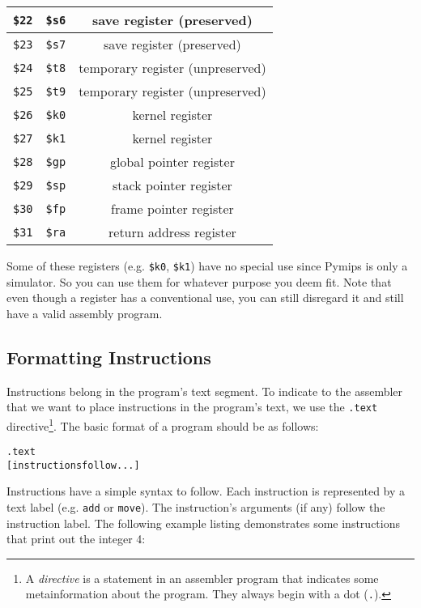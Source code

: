 \documentclass[12pt]{article}
\begin{document}
\begin{tabular}{c | c | c}
    \texttt{\$22} & \texttt{\$s6} & save register (preserved) \\ \hline
    \texttt{\$23} & \texttt{\$s7} & save register (preserved) \\ \hline
    \texttt{\$24} & \texttt{\$t8} & temporary register (unpreserved) \\ \hline
    \texttt{\$25} & \texttt{\$t9} & temporary register (unpreserved) \\ \hline
    \texttt{\$26} & \texttt{\$k0} & kernel register \\ \hline
    \texttt{\$27} & \texttt{\$k1} & kernel register \\ \hline
    \texttt{\$28} & \texttt{\$gp} & global pointer register \\ \hline
    \texttt{\$29} & \texttt{\$sp} & stack pointer register \\ \hline
    \texttt{\$30} & \texttt{\$fp} & frame pointer register \\ \hline
    \texttt{\$31} & \texttt{\$ra} & return address register \\ \hline
\end{tabular}

\vspace{0.1in} Some of these registers (e.g. \texttt{\$k0}, \texttt{\$k1}) have
     no special use since Pymips is only a simulator. So you can use them for
     whatever purpose you deem fit. Note that even though a register has a
     conventional use, you can still disregard it and still have a valid
     assembly program.\\

\subsection{Formatting Instructions}

Instructions belong in the program's text segment. To indicate to the assembler
     that we want to place instructions in the program's text, we use the
     \texttt{.text} directive\footnote{A \textit{directive} is a statement in an
     assembler program that indicates some metainformation about the
     program. They always begin with a dot (\texttt{.}).}. The basic format of a
     program should be as follows:

\begin{alltt}
    .text
    [instructions follow...]
\end{alltt}

Instructions have a simple syntax to follow. Each instruction is represented by
     a text label (e.g. \texttt{add} or \texttt{move}). The instruction's
     arguments (if any) follow the instruction label. The following example
     listing demonstrates some instructions that print out the integer 4:
\end{document}
